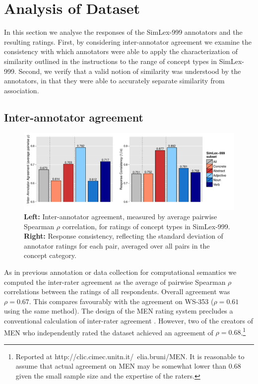 \documentclass[fullname]{clv2}
\begin{document}
\section{Analysis of Dataset}

In this section we analyse the responses of the SimLex-999 annotators and the resulting ratings. First, by considering inter-annotator agreement we examine the consistency with which annotators were able to apply the characterization of similarity outlined in the instructions to the range of concept types in SimLex-999. Second, we verify that a valid notion of similarity was understood by the annotators, in that they were able to accurately separate similarity from association. 

\subsection{Inter-annotator agreement}

\begin{figure}[ht]  \includegraphics[width = \textwidth]{Figure_1A_CL}  \caption{{\bf Left:} Inter-annotator agreement, measured by average pairwise Spearman \(\rho\) correlation, for ratings of concept types in SimLex-999. {\bf Right:} Response consistency, reflecting the standard deviation of annotator ratings for each pair, averaged over all pairs in the concept category.}\end{figure}  

As in previous annotation or data collection for computational semantics \cite{pado2007flexible,reisinger2010mixture,silberer2014learning} we computed the inter-rater agreement as the average of pairwise Spearman \(\rho\) correlations between the ratings of all respondents. Overall agreement was \(\rho=0.67\). This compares favourably with the agreement on WS-353 (\(\rho=0.61\) using the same method). The design of the MEN rating system precludes a conventional calculation of inter-rater agreement \cite{bruni2012distributional2}. However, two of the creators of MEN who independently rated the dataset achieved an agreement of \(\rho=0.68\).\footnote{Reported at http://clic.cimec.unitn.it/~elia.bruni/MEN. It is reasonable to assume that actual agreement on MEN may be somewhat lower than 0.68 given the small sample size and the expertise of the raters.} 
\end{document}
